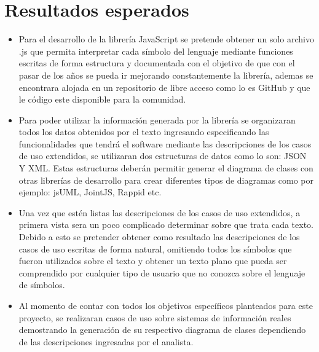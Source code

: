 \documentclass[12pt, openany, xcolor=table]{book}
\begin{document}
	\chapter{Resultados esperados}
	
	\begin{itemize}
		
		\item Para el desarrollo de la librería JavaScript se pretende obtener un solo archivo .js que permita interpretar cada símbolo del lenguaje mediante funciones escritas de forma estructura y documentada con el objetivo de que con el pasar de los años se pueda ir mejorando constantemente la librería, ademas se encontrara alojada en un repositorio de libre acceso como lo es GitHub y que le código este disponible para la comunidad. 
		
		\item Para poder utilizar la información generada por la librería se organizaran todos los datos obtenidos por el texto ingresando especificando las funcionalidades que tendrá el software mediante las descripciones de los casos de uso extendidos, se utilizaran dos estructuras de datos como lo son: JSON Y XML. Estas estructuras deberán permitir generar el diagrama de clases con otras librerías de desarrollo para crear diferentes tipos de diagramas como por ejemplo: jsUML, JointJS, Rappid etc. 
		
		\item Una vez que estén listas las descripciones de los casos de uso extendidos, a primera vista sera un poco complicado determinar sobre que trata cada texto. Debido a esto se pretender obtener como resultado las descripciones de los casos de uso escritas de forma natural, omitiendo todos los símbolos que fueron utilizados sobre el texto y obtener un texto plano que pueda ser comprendido por cualquier tipo de usuario que no conozca sobre el lenguaje de símbolos. 
		 
		
		\item Al momento de contar con todos los objetivos específicos planteados para este proyecto, se realizaran casos de uso sobre sistemas de información reales demostrando la generación de su respectivo diagrama de clases dependiendo de las descripciones ingresadas por el analista. 
		
	\end{itemize}
	
	
	
	
\end{document}
